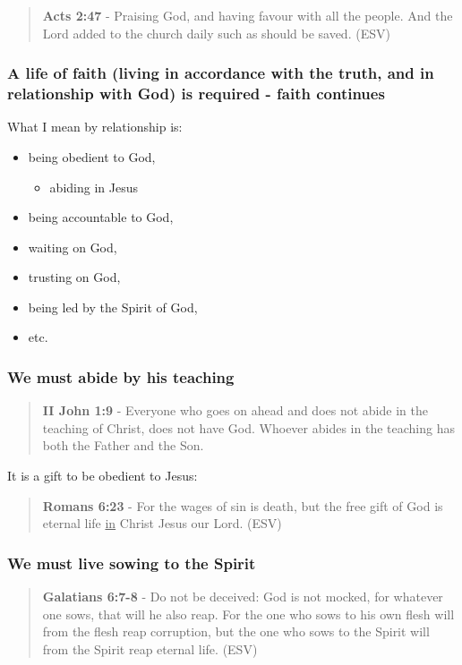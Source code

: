 \documentclass[11pt]{article}
\begin{document}
\begin{quote}
\textbf{Acts 2:47} - Praising God, and having favour with all the people. And the Lord added to the church daily such as should be saved. (ESV)
\end{quote}

\subsubsection{A life of faith (living in accordance with the truth, and in relationship with God) is required - faith continues}
\label{sec:orgd9e218b}
What I mean by relationship is:
\begin{itemize}
\item being obedient to God,
\begin{itemize}
\item abiding in Jesus
\end{itemize}
\item being accountable to God,
\item waiting on God,
\item trusting on God,
\item being led by the Spirit of God,
\item etc.
\end{itemize}

\subsubsection{We must abide by his teaching}
\label{sec:orga2cda19}

\begin{quote}
\textbf{II John 1:9} - Everyone who goes on ahead and does not abide in the teaching of Christ, does not have God. Whoever abides in the teaching has both the Father and the Son.
\end{quote}

It is a gift to be obedient to Jesus:

\begin{quote}
\textbf{Romans 6:23} - For the wages of sin is death, but the free gift of God is eternal life \uline{in} Christ Jesus our Lord. (ESV)
\end{quote}

\subsubsection{We must live sowing to the Spirit}
\label{sec:org856fe47}

\begin{quote}
\textbf{Galatians 6:7-8} - Do not be deceived: God is not mocked, for whatever one sows, that will he also reap. For the one who sows to his own flesh will from the flesh reap corruption, but the one who sows to the Spirit will from the Spirit reap eternal life. (ESV)
\end{quote}
\end{document}
